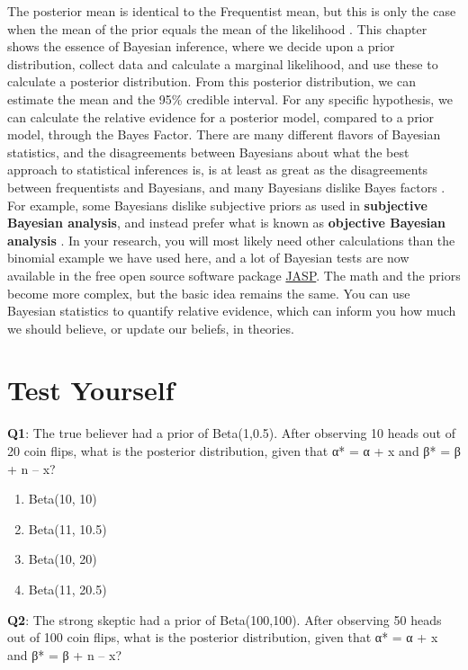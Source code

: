 \documentclass[
]{krantz}
\providecommand{\tightlist}{%
  \setlength{\itemsep}{0pt}\setlength{\parskip}{0pt}}
\begin{document}
The posterior mean is identical to the Frequentist mean, but this is only the case when the mean of the prior equals the mean of the likelihood \citep{albers_credible_2018}. This chapter shows the essence of Bayesian inference, where we decide upon a prior distribution, collect data and calculate a marginal likelihood, and use these to calculate a posterior distribution. From this posterior distribution, we can estimate the mean and the 95\% credible interval. For any specific hypothesis, we can calculate the relative evidence for a posterior model, compared to a prior model, through the Bayes Factor. There are many different flavors of Bayesian statistics, and the disagreements between Bayesians about what the best approach to statistical inferences is, is at least as great as the disagreements between frequentists and Bayesians, and many Bayesians dislike Bayes factors \citep{mcelreath_statistical_2016}. For example, some Bayesians dislike subjective priors as used in \textbf{subjective Bayesian analysis}, and instead prefer what is known as \textbf{objective Bayesian analysis} \citep{berger_interplay_2004}. In your research, you will most likely need other calculations than the binomial example we have used here, and a lot of Bayesian tests are now available in the free open source software package \href{https://jasp-stats.org/}{JASP}. The math and the priors become more complex, but the basic idea remains the same. You can use Bayesian statistics to quantify relative evidence, which can inform you how much we should believe, or update our beliefs, in theories.

\hypertarget{test-yourself-3}{%
\section{Test Yourself}\label{test-yourself-3}}

\textbf{Q1}: The true believer had a prior of Beta(1,0.5). After observing 10 heads out of 20 coin flips, what is the posterior distribution, given that α* = α + x and β* = β + n -- x?

\begin{enumerate}
\def\labelenumi{\Alph{enumi})}
\tightlist
\item
  Beta(10, 10)
\item
  Beta(11, 10.5)
\item
  Beta(10, 20)
\item
  Beta(11, 20.5)
\end{enumerate}

\textbf{Q2}: The strong skeptic had a prior of Beta(100,100). After observing 50 heads out of 100 coin flips, what is the posterior distribution, given that α* = α + x and β* = β + n -- x?
\end{document}
